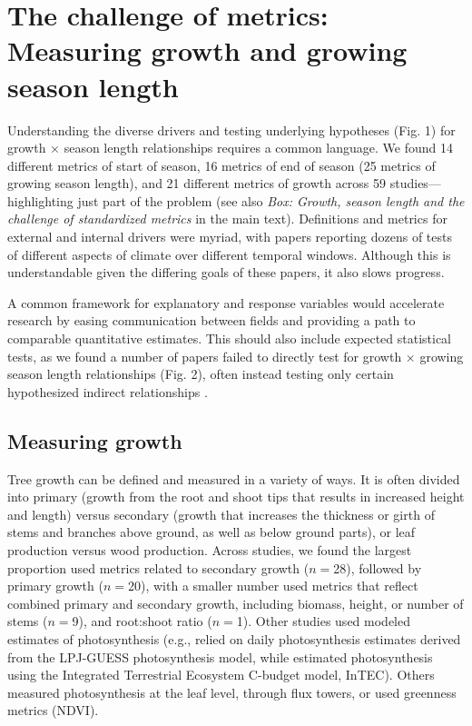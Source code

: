 \documentclass[11pt]{article}
\begin{document}
\section*{The challenge of metrics: Measuring growth and growing season length}

Understanding the diverse drivers and testing underlying hypotheses (Fig. 1) for growth $\times$ season length relationships requires a common language. We found 14 different metrics of start of season, 16 metrics of end of season (25 metrics of growing season length), and 21 different metrics of growth across 59 studies---highlighting just part of the problem (see also \emph{Box: Growth, season length and the challenge of standardized metrics} in the main text). Definitions and metrics for external and internal drivers were myriad, 
with papers reporting dozens of tests of different aspects of climate over different temporal windows. Although this is understandable given the differing goals of these papers, it also slows progress. 

A common framework for explanatory and response variables would accelerate research by easing communication between fields and providing a path to comparable quantitative estimates. 
This should also include expected statistical tests, as we found a number of papers failed to directly test for growth $\times$ growing season length relationships (Fig. 2), often instead testing only certain hypothesized indirect relationships \citep[e.g. spring temperature $\times$ growth in][]{dow2022warm}. 

\subsection*{Measuring growth}

Tree growth can be defined and measured in a variety of ways. It is often divided into primary (growth from the root and shoot tips that results in increased height and length) versus secondary (growth that increases the thickness or girth of stems and branches above ground, as well as below ground parts), or leaf production versus wood production. Across studies, we found the largest proportion used metrics related to secondary growth ($n=$28), followed by primary growth ($n=$20), with a smaller number used metrics that reflect combined primary and secondary growth, including biomass, height, or number of stems ($n=$9), and root:shoot ratio ($n =$1).  Other studies used modeled estimates of photosynthesis (e.g., \cite{smith2014implications} relied on daily photosynthesis estimates derived from the LPJ-GUESS photosynthesis model, while \cite{chen2000approaches} estimated photosynthesis using the Integrated Terrestrial Ecosystem C-budget model, InTEC). 
Others measured photosynthesis at the leaf level, through flux towers, or used greenness metrics (NDVI). 
\end{document}
